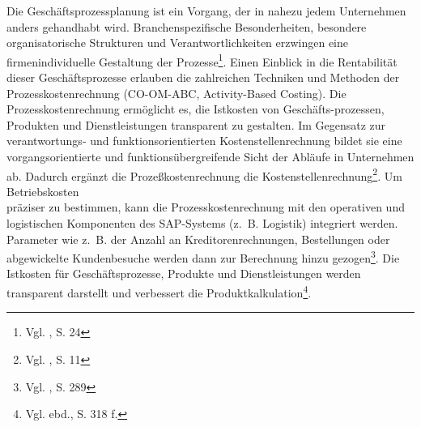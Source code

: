Die Geschäftsprozessplanung ist ein Vorgang, der in nahezu jedem Unternehmen anders gehandhabt wird. Branchenspezifische Besonderheiten, besondere organisatorische Strukturen und Verantwortlichkeiten erzwingen eine firmenindividuelle Gestaltung der Prozesse\footnote{Vgl. \cite{Friedl2008}, S. 24}. Einen Einblick in die Rentabilität dieser Geschäftsprozesse erlauben die zahlreichen Techniken und Methoden der Prozesskostenrechnung (CO-OM-ABC, Activity-Based Costing). Die Prozesskostenrechnung ermöglicht es, die Istkosten von Geschäfts-prozessen, Produkten und Dienstleistungen transparent zu gestalten. Im Gegensatz zur verantwortungs- und funktionsorientierten Kostenstellenrechnung bildet sie eine vorgangsorientierte und funktionsübergreifende Sicht der Abläufe in Unternehmen ab. Dadurch ergänzt die Prozeßkostenrechnung die Kostenstellenrechnung\footnote{Vgl. \cite{SAPCOOMABC2001}, S. 11}. 
Um Betriebskosten \\präziser zu bestimmen, kann die Prozesskostenrechnung mit den operativen und logistischen Komponenten des SAP-Systems (z.~B. Logistik) integriert werden. Parameter wie z.~B. der Anzahl an Kreditorenrechnungen, Bestellungen oder abgewickelte Kundenbesuche werden dann zur Berechnung hinzu gezogen\footnote{Vgl. \cite{Patel2009}, S. 289}. 
Die Istkosten für Geschäftsprozesse, Produkte und Dienstleistungen werden transparent darstellt und verbessert die Produktkalkulation\footnote{Vgl. ebd., S. 318 f.}.



